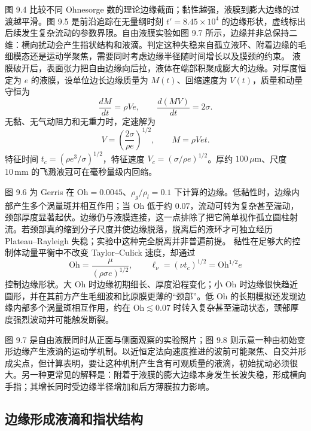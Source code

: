 \documentclass[11pt,a4paper,openany,fontset=none]{ctexbook}
\begin{document}
图 9.4 比较不同 Ohnesorge 数的理论边缘截面；黏性越强，液膜到膨大边缘的过渡越平滑。图 9.5 是前沿追踪在无量纲时刻 $t'=8.45\times10^4$ 的边缘形状，虚线标出后续发生复杂流动的参数界限。自由液膜实验如图 9.7 所示，边缘并非总保持二维：横向扰动会产生指状结构和液滴。判定这种失稳来自孤立液环、附着边缘的毛细模态还是运动学聚焦，需要同时考虑边缘半径随时间增长以及膜颈的约束。
液膜破开后，表面张力把自由边缘向后拉，液体在端部积聚成膨大的边缘。对厚度恒定为 $e$ 的液膜，设单位边长边缘质量为 $M(t)$、回缩速度为 $V(t)$，质量和动量守恒为
\begin{equation}
 \frac{dM}{dt}=\rho Ve,
 \qquad
 \frac{d(MV)}{dt}=2\sigma.
 \tag{9.6--9.7}
\end{equation}
无黏、无气动阻力和无重力时，定速解为
\begin{equation}
 V=\left(\frac{2\sigma}{\rho e}\right)^{1/2},
 \qquad M=\rho Vet.
 \tag{9.8}
\end{equation}
特征时间 $t_c=(\rho e^3/\sigma)^{1/2}$，特征速度
$V_c=(\sigma/\rho e)^{1/2}$。厚约 $100\,\mu\mathrm m$、尺度 $10\,\mathrm{mm}$ 的飞溅液冠可在毫秒量级内回缩。

图 9.6 为 Gerris 在 $\mathrm{Oh}=0.0045$、$\rho_g/\rho_l=0.1$ 下计算的边缘。低黏性时，边缘内部产生多个涡量斑并相互作用；当 $\mathrm{Oh}$ 低于约 $0.07$，流动可转为复杂甚至湍动，颈部厚度显著起伏。边缘仍与液膜连接，这一点排除了把它简单视作孤立圆柱射流。若颈部真的缩到分子尺度并使边缘脱落，脱离后的液环才可独立经历 Plateau--Rayleigh 失稳；实验中这种完全脱离并非普遍前提。
黏性在足够大的控制体动量平衡中不改变 Taylor--Culick 速度，却通过
\begin{equation}
 \mathrm{Oh}=\frac{\mu}{(\rho\sigma e)^{1/2}},
 \qquad \ell_\nu=(\nu t_c)^{1/2}=\mathrm{Oh}^{1/2}e
 \tag{9.9}
\end{equation}
控制边缘形状。大 $\mathrm{Oh}$ 时边缘初期细长、厚度沿程变化；小 $\mathrm{Oh}$ 时边缘很快趋近圆形，并在其前方产生毛细波和比原膜更薄的“颈部”。低 $\mathrm{Oh}$ 的长期模拟还发现边缘内部多个涡量斑相互作用，约在 $\mathrm{Oh}\lesssim0.07$ 时转入复杂甚至湍动状态，颈部厚度强烈波动并可能触发断裂。

图 9.7 是自由液膜同时从正面与侧面观察的实验照片；图 9.8 则示意一种由初始变形边缘产生液滴的运动学机制。以近恒定法向速度推进的波前可能聚焦、自交并形成尖点，但计算表明，要让这种机制产生含有可观质量的液滴，初始扰动必须很大。另一种更常见的解释是：附着于液膜的膨大边缘本身发生长波失稳，形成横向手指；其增长同时受边缘半径增加和后方薄膜拉力影响。
\subsection{边缘形成液滴和指状结构}
\end{document}
